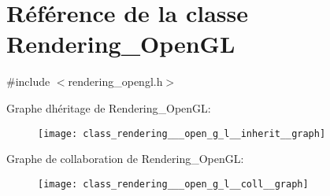 \hypertarget{class_rendering___open_g_l}{}\section{Référence de la classe Rendering\+\_\+\+Open\+GL}
\label{class_rendering___open_g_l}


{\ttfamily \#include $<$rendering\+\_\+opengl.\+h$>$}



Graphe d\textquotesingle{}héritage de Rendering\+\_\+\+Open\+GL\+:
\nopagebreak
\begin{figure}[H]
\begin{center}
\leavevmode
\texttt{[image: class\_rendering\_\_\_open\_g\_l\_\_inherit\_\_graph]}
\end{center}
\end{figure}


Graphe de collaboration de Rendering\+\_\+\+Open\+GL\+:
\nopagebreak
\begin{figure}[H]
\begin{center}
\leavevmode
\texttt{[image: class\_rendering\_\_\_open\_g\_l\_\_coll\_\_graph]}
\end{center}
\end{figure}
